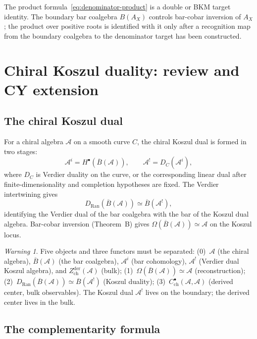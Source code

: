 \documentclass[11pt]{article}
\theoremstyle{definition}
\theoremstyle{remark}
\newtheorem{warning}[theorem]{Warning}
\DeclareMathOperator{\Ran}{Ran}
\newcommand{\cA}{\mathcal{A}}
\newcommand{\barB}{\overline{B}}
\begin{document}
The product formula~\eqref{eq:denominator-product} is a double or BKM
target identity. The boundary bar coalgebra $B(A_X)$ controls
bar-cobar inversion of $A_X$; the product over positive roots is
identified with it only after a recognition map from the boundary
coalgebra to the denominator target has been constructed.


\section{Chiral Koszul duality: review and CY extension}
\label{sec:chiral-koszul-review}

\subsection{The chiral Koszul dual}

For a chiral algebra $\cA$ on a smooth curve $C$, the chiral Koszul dual
is formed in two stages:
\[
\cA^i = H^\bullet(\barB(\cA)),\qquad
\cA^! = D_C(\cA^i),
\]
where $D_C$ is Verdier duality on the curve, or the corresponding
linear dual after finite-dimensionality and completion hypotheses are
fixed. The Verdier intertwining gives
\[
D_{\Ran}(\barB(\cA)) \simeq \barB(\cA^!),
\]
identifying the Verdier dual of the bar coalgebra with the bar of the
Koszul dual algebra. Bar-cobar inversion (Theorem~B) gives
$\Omega(\barB(\cA)) \simeq \cA$ on the Koszul locus.

\begin{warning}
Five objects and three functors must be separated:
(0)~$\cA$ (the chiral algebra), $\barB(\cA)$ (the bar coalgebra),
$\cA^i$ (bar cohomology), $\cA^!$ (Verdier dual Koszul algebra), and
$Z^{\mathrm{der}}_{\mathrm{ch}}(\cA)$ (bulk);
(1)~$\Omega(\barB(\cA)) \simeq \cA$ (reconstruction);
(2)~$D_{\Ran}(\barB(\cA)) \simeq \barB(\cA^!)$ (Koszul duality);
(3)~$C^\bullet_{\mathrm{ch}}(\cA, \cA)$ (derived center, bulk observables).
The Koszul dual $\cA^!$ lives on the boundary; the derived center lives
in the bulk.
\end{warning}

\subsection{The complementarity formula}
\end{document}
